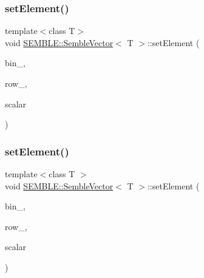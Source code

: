\mbox{\label{structSEMBLE_1_1SembleVector_a0eeec0b9e7992933a309dde7b0d92b05}} 
\subsubsection{\texorpdfstring{setElement()}{setElement()}\hspace{0.1cm}{\footnotesize\ttfamily [3/4]}}
{\footnotesize\ttfamily template$<$class T$>$ \\
void \mbox{\hyperlink{structSEMBLE_1_1SembleVector}{S\+E\+M\+B\+L\+E\+::\+Semble\+Vector}}$<$ T $>$\+::set\+Element (\begin{DoxyParamCaption}\item[{const int}]{bin\+\_\+,  }\item[{const int}]{row\+\_\+,  }\item[{const typename \mbox{\hyperlink{structSEMBLE_1_1PromoteScalar}{Promote\+Scalar}}$<$ T $>$\+::Type \&}]{scalar }\end{DoxyParamCaption})}

\mbox{\label{structSEMBLE_1_1SembleVector_a0eeec0b9e7992933a309dde7b0d92b05}} 
\subsubsection{\texorpdfstring{setElement()}{setElement()}\hspace{0.1cm}{\footnotesize\ttfamily [4/4]}}
{\footnotesize\ttfamily template$<$class T $>$ \\
void \mbox{\hyperlink{structSEMBLE_1_1SembleVector}{S\+E\+M\+B\+L\+E\+::\+Semble\+Vector}}$<$ T $>$\+::set\+Element (\begin{DoxyParamCaption}\item[{const int}]{bin\+\_\+,  }\item[{const int}]{row\+\_\+,  }\item[{const typename \mbox{\hyperlink{structSEMBLE_1_1PromoteScalar}{Promote\+Scalar}}$<$ T $>$\+::Type \&}]{scalar }\end{DoxyParamCaption})}

